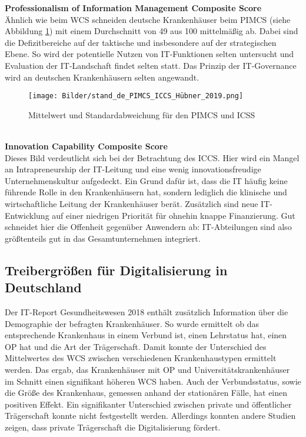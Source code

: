 \textbf{Professionalism of Information Management Composite Score}\\
Ähnlich wie beim WCS schneiden deutsche Krankenhäuser beim PIMCS (siehe Abbildung \ref{fig:stand_de_PIMCS_ICCS}) mit einem Durchschnitt von 49 aus 100 mittelmäßig ab. Dabei sind die Defizitbereiche auf der taktische und insbesondere auf der strategischen Ebene. So wird der potentielle Nutzen von IT-Funktionen selten untersucht und Evaluation der IT-Landschaft findet selten statt. Das Prinzip der IT-Governance wird an deutschen Krankenhäusern selten angewandt.
\begin{figure}[ht]
	\centering
	\texttt{[image: Bilder/stand\_de\_PIMCS\_ICCS\_Hübner\_2019.png]}
	\caption{Mittelwert und Standardabweichung für den PIMCS und ICSS \parencite{huebner2019}}
	\label{fig:stand_de_PIMCS_ICCS}
\end{figure}
\vspace{\parheadvspace}\\
\textbf{Innovation Capability Composite Score}\\
Dieses Bild verdeutlicht sich bei der Betrachtung des ICCS. Hier wird ein Mangel an Intrapreneurship der IT-Leitung und eine wenig innovationsfreudige Unternehmenskultur aufgedeckt. Ein Grund dafür ist, dass die IT häufig keine führende Rolle in den Krankenhäusern hat, sondern lediglich die klinische und wirtschaftliche Leitung der Krankenhäuser berät. Zusätzlich sind neue IT-Entwicklung auf einer niedrigen Priorität für ohnehin knappe Finanzierung. Gut schneidet hier die Offenheit gegenüber Anwendern ab: IT-Abteilungen sind also größtenteils gut in das Gesamtunternehmen integriert.
\subsection{Treibergrößen für Digitalisierung in Deutschland}

Der IT-Report Gesundheitswesen 2018 enthält zusätzlich Information über die Demographie der befragten Krankenhäuser. So wurde ermittelt ob das entsprechende Krankenhaus in einem Verbund ist, einen Lehrstatus hat, einen OP hat und die Art der Trägerschaft. Damit konnte der Unterschied des Mittelwertes des WCS zwischen verschiedenen Krankenhaustypen ermittelt werden. Das ergab, das Krankenhäuser mit OP und Universitätskrankenhäuser im Schnitt einen signifikant höheren WCS haben. Auch der Verbundsstatus, sowie die Größe des Krankenhaus, gemessen anhand der stationären Fälle, hat einen positiven Effekt. \parencite{huebner2019}
Ein signifikanter Unterschied zwischen private und öffentlicher Trägerschaft konnte nicht festgestellt werden. Allerdings konnten andere Studien \parencite{cresswell2013} zeigen, dass private Trägerschaft die Digitalisierung fördert.

